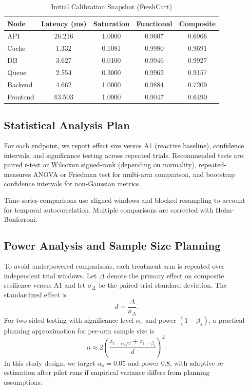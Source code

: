 \documentclass[conference]{IEEEtran}
\begin{document}
\begin{table}[t]
\caption{Initial Calibration Snapshot (FreshCart)}
\label{tab:nodes}
\centering
\footnotesize
\begin{tabular}{lcccc}
\toprule
Node & Latency (ms) & Saturation & Functional & Composite \\
\midrule
API      & 26.216 & 1.0000 & 0.9607 & 0.6966 \\
Cache    & 1.332  & 0.1081 & 0.9980 & 0.9691 \\
DB       & 3.627  & 0.0100 & 0.9946 & 0.9927 \\
Queue    & 2.554  & 0.3000 & 0.9962 & 0.9157 \\
Backend  & 4.662  & 1.0000 & 0.9884 & 0.7209 \\
Frontend & 63.503 & 1.0000 & 0.9047 & 0.6490 \\
\bottomrule
\end{tabular}
\end{table}

\subsection{Statistical Analysis Plan}
For each endpoint, we report effect size versus A1 (reactive baseline), confidence intervals, and significance testing across repeated trials. Recommended tests are: paired $t$-test or Wilcoxon signed-rank (depending on normality), repeated-measures ANOVA or Friedman test for multi-arm comparison, and bootstrap confidence intervals for non-Gaussian metrics.

Time-series comparisons use aligned windows and blocked resampling to account for temporal autocorrelation. Multiple comparisons are corrected with Holm-Bonferroni.

\subsection{Power Analysis and Sample Size Planning}
To avoid underpowered comparisons, each treatment arm is repeated over independent trial windows. Let $\Delta$ denote the primary effect on composite resilience versus A1 and let $\sigma_\Delta$ be the paired-trial standard deviation. The standardized effect is
\begin{equation}
d = \frac{\Delta}{\sigma_\Delta}.
\label{eq:effectsize}
\end{equation}
For two-sided testing with significance level $\alpha_s$ and power $(1-\beta_s)$, a practical planning approximation for per-arm sample size is
\begin{equation}
n \approx 2\left(\frac{z_{1-\alpha_s/2} + z_{1-\beta_s}}{d}\right)^2.
\label{eq:power}
\end{equation}
In this study design, we target $\alpha_s=0.05$ and power $0.8$, with adaptive re-estimation after pilot runs if empirical variance differs from planning assumptions.
\end{document}
